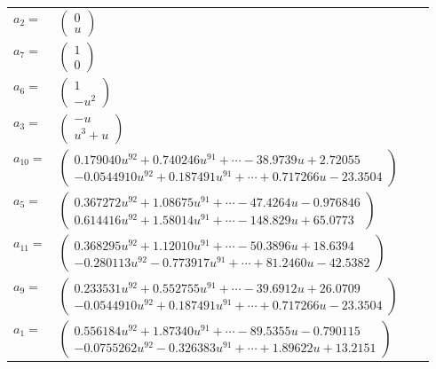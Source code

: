 \documentclass[1p]{elsarticle_modified}
\theoremstyle{definition}
\begin{document}
\begin{tabular}{m{7pt} m{180pt} m{7pt} m{180pt} }
\flushright $a_{2}=$&$\begin{pmatrix}0\\u\end{pmatrix}$ \\
\flushright $a_{7}=$&$\begin{pmatrix}1\\0\end{pmatrix}$ \\
\flushright $a_{6}=$&$\begin{pmatrix}1\\- u^2\end{pmatrix}$ \\
\flushright $a_{3}=$&$\begin{pmatrix}- u\\u^3+u\end{pmatrix}$ \\
\flushright $a_{10}=$&$\begin{pmatrix}0.179040 u^{92}+0.740246 u^{91}+\cdots-38.9739 u+2.72055\\-0.0544910 u^{92}+0.187491 u^{91}+\cdots+0.717266 u-23.3504\end{pmatrix}$ \\
\flushright $a_{5}=$&$\begin{pmatrix}0.367272 u^{92}+1.08675 u^{91}+\cdots-47.4264 u-0.976846\\0.614416 u^{92}+1.58014 u^{91}+\cdots-148.829 u+65.0773\end{pmatrix}$ \\
\flushright $a_{11}=$&$\begin{pmatrix}0.368295 u^{92}+1.12010 u^{91}+\cdots-50.3896 u+18.6394\\-0.280113 u^{92}-0.773917 u^{91}+\cdots+81.2460 u-42.5382\end{pmatrix}$ \\
\flushright $a_{9}=$&$\begin{pmatrix}0.233531 u^{92}+0.552755 u^{91}+\cdots-39.6912 u+26.0709\\-0.0544910 u^{92}+0.187491 u^{91}+\cdots+0.717266 u-23.3504\end{pmatrix}$ \\
\flushright $a_{1}=$&$\begin{pmatrix}0.556184 u^{92}+1.87340 u^{91}+\cdots-89.5355 u-0.790115\\-0.0755262 u^{92}-0.326383 u^{91}+\cdots+1.89622 u+13.2151\end{pmatrix}$ \\

\end{tabular}
\end{document}
